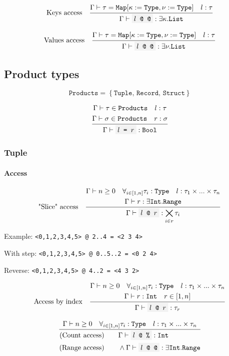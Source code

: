 \documentclass[11pt]{report}
\newcommand{\set}[1]{\left\{#1\right\}}
\newcommand{\infrule}[3][gathered]{\frac{\begin{#1}#2\end{#1}}{\begin{gathered}#3\end{gathered}}}
\newcommand{\then}{\vdash}
\newcommand{\code}[1]{\texttt{\colorbox{gray!10}{#1}}}
\newcommand{\Type}{\texttt{Type}}
\newcommand{\Bool}{\texttt{Bool}}
\newcommand{\Int}{\texttt{Int}}
\newcommand{\List}{\texttt{List}}
\newcommand{\Map}{\texttt{Map}}
\newcommand{\Range}{\texttt{Range}}
\newcommand{\Env}{\Gamma}
\theoremstyle{definition}
\begin{document}
\[
	\text{Keys access}\quad
	\infrule{
		\Env\then \tau = \Map[\kappa:=\Type,\nu:=\Type] \quad l:\tau \\*
	}{
		\Env\then \code{$l$ @ @}: \exists\kappa.\List
	}
\]

\[
	\text{Values access}\quad
	\infrule{
		\Env\then \tau = \Map[\kappa:=\Type,\nu:=\Type] \quad l:\tau \\*
	}{
		\Env\then \code{$l$ @ @}: \exists\nu.\List
	}
\]

\subsection{Product types}

\[
	\texttt{Products} = \set{\texttt{Tuple, Record, Struct}}
\]

\[
	\infrule{
		\Env\then \tau \in \texttt{Products} \quad l:\tau \\*
		\Env\then \sigma \in \texttt{Products} \quad r:\sigma
	}{
		\Env\then \code{$l$ = $r$}: \Bool
	}
\]


\subsubsection{Tuple}

\paragraph{Access}

\[
	\text{"Slice" access}\quad
	\infrule{
		\Env\then n \geq 0 \quad \forall_{i\in[1,n]}{\tau_i:\Type} \quad l:\tau_1 \times ... \times \tau_n \\*
		\Env\then r:\exists\Int.\Range
	}{
		\Env\then \code{$l$ @ $r$}: \bigtimes_{i \in r} \tau_i
	}
\]

Example: \code{<0,1,2,3,4,5> @ 2..4 = <2 3 4>}

With step: \code{<0,1,2,3,4,5> @ 0..5..2 = <0 2 4>}

Reverse: \code{<0,1,2,3,4,5> @ 4..2 = <4 3 2>}

\[
	\text{Access by index}\quad
	\infrule{
		\Env\then n \geq 0 \quad \forall_{i\in[1,n]}{\tau_i:\Type} \quad l:\tau_1 \times ... \times \tau_n \\*
		\Env\then r:\Int \quad r \in [1,n]
	}{
		\Env\then \code{$l$ @ $r$}: \tau_r
	}
\]

\[
	\infrule{
		\Env\then n \geq 0 \quad \forall_{i\in[1,n]}{\tau_i:\Type} \quad l:\tau_1 \times ... \times \tau_n \\*
	}{
		\begin{aligned}
			\text{(Count access)} \qquad & \Env\then \code{$l$ @ \%}: \Int                           \\
			\text{(Range access)} \qquad & \land\Env\then \code{$l$ @ @}: \exists\Int.\Range 
		\end{aligned}
	}
\]
\end{document}
